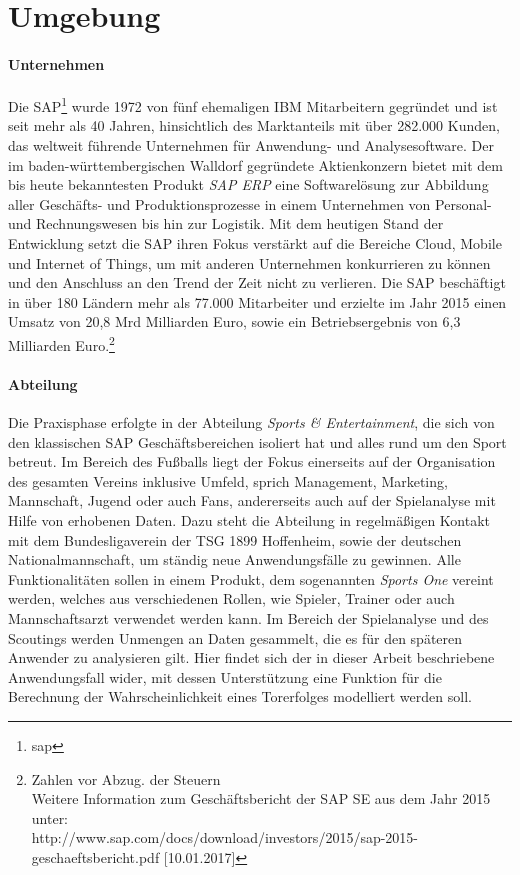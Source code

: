 \section{Umgebung}
\paragraph{Unternehmen}
Die SAP\footnote{\gls{sap}} wurde 1972 von fünf ehemaligen IBM Mitarbeitern gegründet und ist seit mehr als 40 Jahren, hinsichtlich des Marktanteils mit über 282.000 Kunden, das weltweit führende Unternehmen für Anwendung- und Analysesoftware. Der im baden-württembergischen Walldorf gegründete Aktienkonzern bietet mit dem bis heute bekanntesten Produkt \textit{SAP ERP} eine Softwarelösung zur Abbildung aller Geschäfts- und Produktionsprozesse in einem Unternehmen von Personal- und Rechnungswesen bis hin zur Logistik. Mit dem heutigen Stand der Entwicklung setzt die SAP ihren Fokus verstärkt auf die Bereiche Cloud, Mobile und Internet of Things, um mit anderen Unternehmen konkurrieren zu können und den Anschluss an den Trend der Zeit nicht zu verlieren. Die SAP beschäftigt in über 180 Ländern mehr als 77.000 Mitarbeiter und erzielte im Jahr 2015 einen Umsatz von 20,8 Mrd Milliarden Euro, sowie ein Betriebsergebnis von 6,3 Milliarden Euro.\footnote{Zahlen vor Abzug. der Steuern\\ Weitere Information zum Geschäftsbericht der SAP SE aus dem Jahr 2015 unter: \\ http://www.sap.com/docs/download/investors/2015/sap-2015-geschaeftsbericht.pdf [10.01.2017]}

\paragraph{Abteilung}
Die Praxisphase erfolgte in der Abteilung \textit{Sports \& Entertainment}, die sich von den klassischen SAP Geschäftsbereichen isoliert hat und alles rund um den Sport betreut. Im Bereich des Fußballs liegt der Fokus einerseits auf der Organisation des gesamten Vereins inklusive Umfeld, sprich Management, Marketing, Mannschaft, Jugend oder auch Fans, andererseits auch auf der Spielanalyse mit Hilfe von erhobenen Daten. Dazu steht die Abteilung in regelmäßigen Kontakt mit dem Bundesligaverein der TSG 1899 Hoffenheim, sowie der deutschen Nationalmannschaft, um ständig neue Anwendungsfälle zu gewinnen. Alle Funktionalitäten sollen in einem Produkt, dem sogenannten \textit{Sports One} vereint werden, welches aus verschiedenen Rollen, wie Spieler, Trainer oder auch Mannschaftsarzt verwendet werden kann. Im Bereich der Spielanalyse und des Scoutings werden Unmengen an Daten gesammelt, die es für den späteren Anwender zu analysieren gilt. Hier findet sich der in dieser Arbeit beschriebene Anwendungsfall wider, mit dessen Unterstützung eine Funktion für die Berechnung der Wahrscheinlichkeit eines Torerfolges modelliert werden soll.